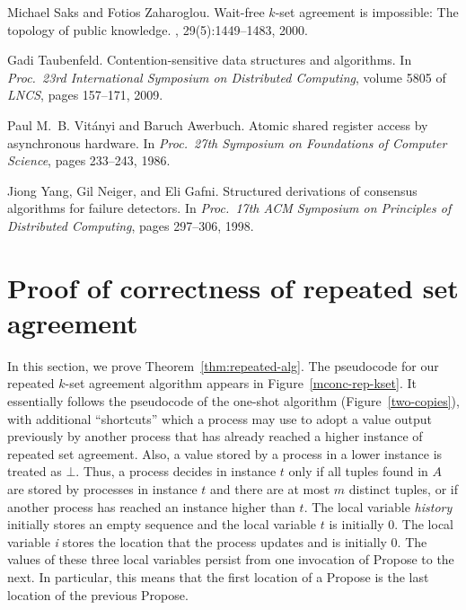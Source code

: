 \documentclass[11pt]{article}
\begin{document}
\begin{thebibliography}{10}
Michael Saks and Fotios Zaharoglou.
\newblock Wait-free $k$-set agreement is impossible: The topology of public
  knowledge.
, 29(5):1449--1483, 2000.

Gadi Taubenfeld.
\newblock Contention-sensitive data structures and algorithms.
\newblock In {\em Proc.\ 23rd International Symposium on Distributed
  Computing}, volume 5805 of {\em LNCS}, pages 157--171, 2009.

Paul M.~B. Vit{\'{a}}nyi and Baruch Awerbuch.
\newblock Atomic shared register access by asynchronous hardware.
\newblock In {\em Proc.~27th Symposium on Foundations of Computer Science},
  pages 233--243, 1986.

Jiong Yang, Gil Neiger, and Eli Gafni.
\newblock Structured derivations of consensus algorithms for failure detectors.
\newblock In {\em Proc.\ 17th ACM Symposium on Principles of Distributed
  Computing}, pages 297--306, 1998.

\end{thebibliography}




\newpage

\newpage
\appendix

\section{Proof of correctness of repeated set agreement}
\label{app:non-anon-algorithm}

In this section, we prove Theorem~\ref{thm:repeated-alg}.
The pseudocode for our repeated $k$-set agreement algorithm appears in
Figure~\ref{mconc-rep-kset}.  
It essentially follows the pseudocode of the  one-shot algorithm
(Figure~\ref{two-copies}), with additional ``shortcuts'' which a
process may use to adopt a value output previously by another process that has
already reached a higher instance of repeated set agreement. 
Also, a value stored by a process in a lower instance is treated as
$\bot$.
Thus, a process decides in instance $t$ only if all tuples found in $A$ are stored by
processes in instance $t$ and there are at most $m$ distinct tuples, or
if another process has reached an instance higher than $t$.     
The local variable {\it history} initially stores an empty sequence and the local
variable $t$ is initially 0.  
The local variable {\it i} stores the location that the process updates and is initially 0. 
The values of these three local variables persist from one
invocation of {\sc Propose} to the next.
In particular, this means that the first location  of a 
{\sc Propose} is the last location of the previous {\sc Propose}. 
\end{document}
